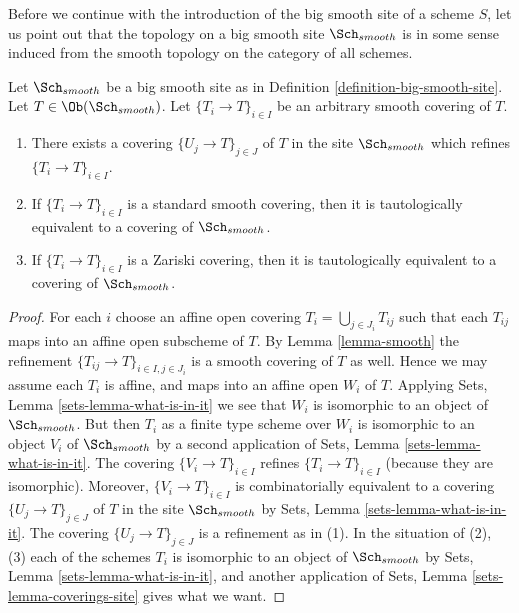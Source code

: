\medskip\noindent
Before we continue with the introduction of the big smooth site of
a scheme $S$, let us point out that the topology on a big smooth site
$\Sch_{smooth}$ is in some sense induced from the smooth topology
on the category of all schemes.

\begin{lemma}
\label{lemma-smooth-induced}
Let $\Sch_{smooth}$ be a big smooth site as in
Definition \ref{definition-big-smooth-site}.
Let $T \in \Ob(\Sch_{smooth})$.
Let $\{T_i \to T\}_{i \in I}$ be an arbitrary smooth covering of $T$.
\begin{enumerate}
\item There exists a covering $\{U_j \to T\}_{j \in J}$ of $T$ in the site
$\Sch_{smooth}$ which refines $\{T_i \to T\}_{i \in I}$.
\item If $\{T_i \to T\}_{i \in I}$ is a standard smooth covering, then
it is tautologically equivalent to a covering of $\Sch_{smooth}$.
\item If $\{T_i \to T\}_{i \in I}$ is a Zariski covering, then
it is tautologically equivalent to a covering of $\Sch_{smooth}$.
\end{enumerate}
\end{lemma}

\begin{proof}
For each $i$ choose an affine open covering $T_i = \bigcup_{j \in J_i} T_{ij}$
such that each $T_{ij}$ maps into an affine open subscheme of $T$. By
Lemma \ref{lemma-smooth}
the refinement $\{T_{ij} \to T\}_{i \in I, j \in J_i}$ is a smooth covering
of $T$ as well. Hence we may assume each $T_i$ is affine, and maps into
an affine open $W_i$ of $T$. Applying
Sets, Lemma \ref{sets-lemma-what-is-in-it}
we see that $W_i$ is isomorphic to an object of $\Sch_{smooth}$.
But then $T_i$ as a finite type scheme over $W_i$
is isomorphic to an object $V_i$ of $\Sch_{smooth}$ by a second
application of
Sets, Lemma \ref{sets-lemma-what-is-in-it}.
The covering $\{V_i \to T\}_{i \in I}$ refines $\{T_i \to T\}_{i \in I}$
(because they are isomorphic).
Moreover, $\{V_i \to T\}_{i \in I}$ is combinatorially equivalent to a
covering $\{U_j \to T\}_{j \in J}$ of $T$ in the site
$\Sch_{smooth}$ by
Sets, Lemma \ref{sets-lemma-what-is-in-it}.
The covering $\{U_j \to T\}_{j \in J}$ is a refinement as in (1).
In the situation of (2), (3) each of the
schemes $T_i$ is isomorphic to an object of $\Sch_{smooth}$ by
Sets, Lemma \ref{sets-lemma-what-is-in-it},
and another application of
Sets, Lemma \ref{sets-lemma-coverings-site}
gives what we want.
\end{proof}

